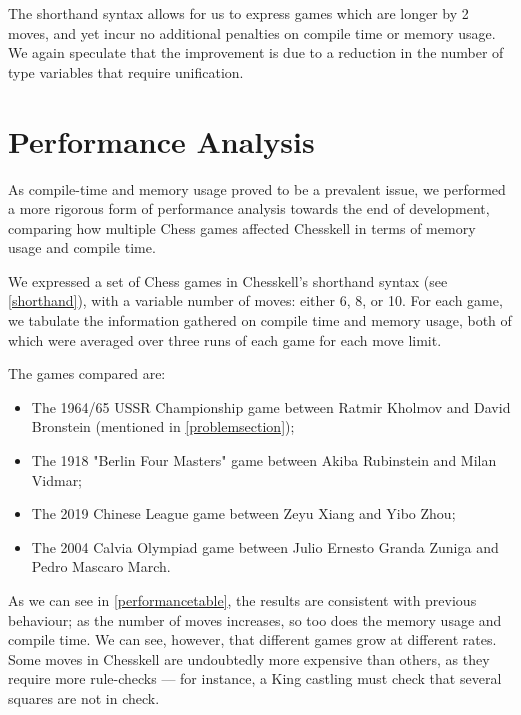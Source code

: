 The shorthand syntax allows for us to express games which are longer by 2 moves, and yet incur no additional penalties on compile time or memory usage. We again speculate that the improvement is due to a reduction in the number of type variables that require unification.

\section{Performance Analysis} \label{performanceanalysis}

As compile-time and memory usage proved to be a prevalent issue, we performed a more rigorous form of performance analysis towards the end of development, comparing how multiple Chess games affected Chesskell in terms of memory usage and compile time.

We expressed a set of Chess games in Chesskell's shorthand syntax (see \cref{shorthand}), with a variable number of moves: either 6, 8, or 10. For each game, we tabulate the information gathered on compile time and memory usage, both of which were averaged over three runs of each game for each move limit.

The games compared are:

\begin{itemize}
    \item The 1964/65 USSR Championship game between Ratmir Kholmov and David Bronstein (mentioned in \cref{problemsection});
    \item The 1918 "Berlin Four Masters" game between Akiba Rubinstein and Milan Vidmar;
    \item The 2019 Chinese League game between Zeyu Xiang and Yibo Zhou;
    \item The 2004 Calvia Olympiad game between Julio Ernesto Granda Zuniga and Pedro Mascaro March.
\end{itemize}

As we can see in \cref{performancetable}, the results are consistent with previous behaviour; as the number of moves increases, so too does the memory usage and compile time. We can see, however, that different games grow at different rates. Some moves in Chesskell are undoubtedly more expensive than others, as they require more rule-checks --- for instance, a King castling must check that several squares are not in check.

